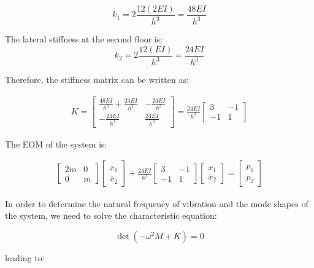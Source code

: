 \documentclass[12pt,letter]{article}
\begin{document}
\begin{example}
\begin{equation}
k_1 = 2 \frac{12(2EI)}{h^3} = \frac{48EI}{h^3}
\end{equation}

\noindent The lateral stiffness at the second floor is:
\begin{equation}
k_2 = 2 \frac{12(EI)}{h^3} = \frac{24EI}{h^3}
\end{equation}

\noindent Therefore, the stiffness matrix can be written as:

\begin{eqnarray}
K= \begin{bmatrix} \frac{48EI}{h^3} + \frac{24EI}{h^3} & -\frac{24EI}{h^3}  \\  -\frac{24EI}{h^3} & \frac{24EI}{h^3} \end{bmatrix} = \frac{24EI}{h^3} \begin{bmatrix} 3 & -1  \\  -1 & 1 \end{bmatrix}
\end{eqnarray}		


The EOM of the system is:

\begin{eqnarray} 
\begin{bmatrix} 2m & 0  \\  0 & m \end{bmatrix}\begin{bmatrix} \ddot{x_1} \\  \ddot{x_2} \end{bmatrix} + \frac{24EI}{h^3} \begin{bmatrix} 3 & -1  \\  -1 & 1 \end{bmatrix}\begin{bmatrix} x_1 \\  x_2 \end{bmatrix}  = \begin{bmatrix} p_1 \\  p_2 \end{bmatrix}
\end{eqnarray}

In order to determine the natural frequency of vibration and the mode shapes of the system, we need to solve the characteristic equation:

\begin{equation}
\det(-\omega^2 M  + K) = 0
\end{equation}

\noindent leading to:


\end{example}
\end{document}
